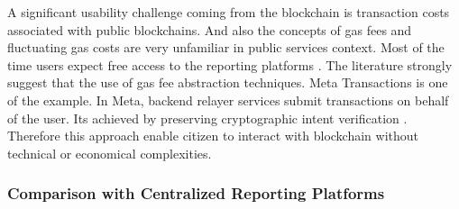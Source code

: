 
A significant usability challenge coming from the blockchain is transaction costs associated with public blockchains. And also the concepts of gas fees and fluctuating gas costs are very unfamiliar in public services context. Most of the time users expect free access to the reporting platforms \cite{mdpi2025usercentric}. The literature strongly suggest that the use of gas fee abstraction techniques. Meta Transactions is one of the example. In Meta, backend relayer services submit transactions on behalf of the user. Its achieved by preserving cryptographic intent verification \cite{sonule2025uxweb3}. Therefore this approach enable citizen to interact with blockchain without technical or economical complexities.


\subsubsection*{Comparison with Centralized Reporting Platforms}



